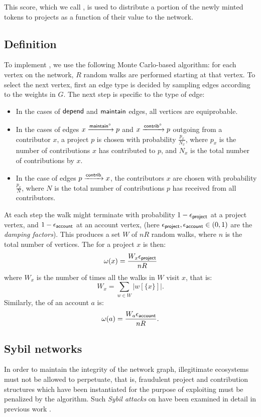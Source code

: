 This score, which we call \osrank{}, is used to distribute a portion of the
newly minted tokens to projects as a function of their value to the \oscoin{}
network.

\subsection{Definition}

To implement \osrank{}, we use the following Monte Carlo-based algorithm: for
each vertex on the network, $R$ random walks are performed starting at that
vertex. To select the next vertex, first an edge type is decided
by sampling edges according to the weights in $G$. The next step is specific to
the type of edge:

\begin{itemize}
\item In the cases of $\mathsf{depend}$ and $\mathsf{maintain}$ edges, all vertices are equiprobable.
\item In the cases of edges $x \xrightarrow[]{\mathsf{maintain}^\circ} p$ and
  $x \xrightarrow[]{\mathsf{contrib}^\circ} p$ outgoing from a contributor $x$, a project $p$ is
  chosen with probability $\frac{p_x}{N_x}$, where $p_x$ is the number of
  contributions $x$ has contributed to $p$, and $N_x$ is the total number of
  contributions by $x$.
\item In the case of edges $p \xrightarrow[]{\mathsf{contrib}} x$, the contributors $x$ are
  chosen with probability $\frac{p_x}{N}$, where $N$ is the total number of
  contributions $p$ has received from all contributors.
\end{itemize}

\noindent At each step the walk might terminate with probability $1 - \epsilon_{\mathsf{project}}$ at a
project vertex, and $1 - \epsilon_{\mathsf{account}}$ at an account vertex, (here
$\epsilon_{\mathsf{project}}, \epsilon_{\mathsf{account}} \in (0,1)$ are the \emph{damping factors}). This
produces a set $W$ of $nR$ random walks, where $n$ is the total number of
vertices. The \osrank{} for a project $x$ is then:
\[
  \omega(x) = \frac{W_x \epsilon_{\mathsf{project}}}{n R}
\]
where $W_x$ is the number of times all the walks in $W$ visit $x$, that is:
\[
  W_x = \sum_{w \in W} |w[\{x\}]|.
\]
Similarly, the \osrank{} of an account $a$ is:
\[
  \omega(a) = \frac{W_a \epsilon_{\mathsf{account}}}{n R}.
\]

\subsection{Sybil networks}

In order to maintain the integrity of the \oscoin{} network graph, illegitimate
ecosystems must not be allowed to perpetuate, that is, fraudulent project and
contribution structures which have been instantiated for the purpose of
exploiting \osrank{} must be penalized by the algorithm.  Such \emph{Sybil attacks}
on \pagerank{} have been examined in detail in previous work
\cite{pagerank-sybil}.

